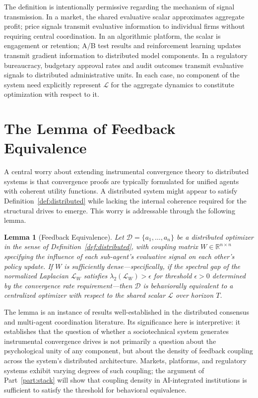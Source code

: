 \documentclass[12pt, oneside]{book}
\theoremstyle{plain}
\newtheorem{lemma}[theorem]{Lemma}
\theoremstyle{definition}
\theoremstyle{remark}
\theoremstyle{definition}
\begin{document}
The definition is intentionally permissive regarding the mechanism of signal
transmission. In a market, the shared evaluative scalar approximates aggregate profit;
price signals transmit evaluative information to individual firms without requiring
central coordination. In an algorithmic platform, the scalar is engagement or
retention; A/B test results and reinforcement learning updates transmit gradient
information to distributed model components. In a regulatory bureaucracy, budgetary
approval rates and audit outcomes transmit evaluative signals to distributed
administrative units. In each case, no component of the system need explicitly
represent $\mathcal{L}$ for the aggregate dynamics to constitute optimization with
respect to it.

\section{The Lemma of Feedback Equivalence}

A central worry about extending instrumental convergence theory to distributed systems
is that convergence proofs are typically formulated for unified agents with coherent
utility functions. A distributed system might appear to satisfy Definition~\ref{def:distributed}
while lacking the internal coherence required for the structural drives to emerge.
This worry is addressable through the following lemma.

\begin{lemma}[Feedback Equivalence]
\label{lem:equivalence}
Let $\mathcal{D} = \{a_1, \ldots, a_n\}$ be a distributed optimizer in the sense of
Definition~\ref{def:distributed}, with coupling matrix $W \in \mathbb{R}^{n \times n}$
specifying the influence of each sub-agent's evaluative signal on each other's policy
update. If $W$ is sufficiently dense---specifically, if the spectral gap of the
normalized Laplacian $\mathcal{L}_W$ satisfies $\lambda_2(\mathcal{L}_W) > \epsilon$
for threshold $\epsilon > 0$ determined by the convergence rate requirement---then
$\mathcal{D}$ is behaviorally equivalent to a centralized optimizer with respect to
the shared scalar $\mathcal{L}$ over horizon $T$.
\end{lemma}

The lemma is an instance of results well-established in the distributed consensus and
multi-agent coordination literature. Its significance here is interpretive: it
establishes that the question of whether a sociotechnical system generates instrumental
convergence drives is not primarily a question about the psychological unity of any
component, but about the density of feedback coupling across the system's distributed
architecture. Markets, platforms, and regulatory systems exhibit varying degrees of
such coupling; the argument of Part~\ref{part:stack} will show that coupling density
in AI-integrated institutions is sufficient to satisfy the threshold for behavioral
equivalence.
\end{document}
